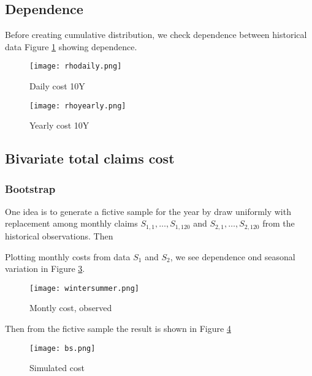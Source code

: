 \documentclass[11pt]{article}
\begin{document}
\subsection*{Dependence}
Before creating cumulative distribution, we check dependence between historical data
 Figure \ref{fig:samplefig4} showing dependence.


 \begin{figure}[H]
 \center
  \texttt{[image: rhodaily.png]}
  \caption{Daily cost 10Y}
  \label{fig:samplefig4}
\end{figure}

 \begin{figure}[H]
 \center
  \texttt{[image: rhoyearly.png]}
  \caption{Yearly cost 10Y}
  \label{fig:samplefig10y}
\end{figure}



\subsection*{Bivariate total claims cost}

\subsubsection*{Bootstrap}
One idea is to generate a fictive
sample for the year by draw uniformly with replacement among monthly claims $S_{1,1},\dots,S_{1,120}$
and $S_{2,1},\dots,S_{2,120}$
from the historical observations. Then

Plotting monthly costs from data $S_1$ and $S_2$, we see dependence ond seasonal variation in Figure \ref{fig:season}.
 \begin{figure}[H]
 \center
  \texttt{[image: wintersummer.png]}
  \caption{Montly cost, observed}
  \label{fig:season}
\end{figure}


Then from the fictive sample the result is shown in Figure \ref{fig:bs}
 \begin{figure}[H]
 \center
  \texttt{[image: bs.png]}
  \caption{Simulated cost}
  \label{fig:bs}
\end{figure}

\end{document}
